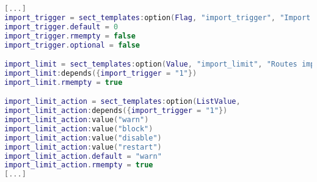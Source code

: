 \begin{lstlisting}[language=lua, caption={LUCI tied options implementation}]
[...]
import_trigger = sect_templates:option(Flag, "import_trigger", "Import       Limit", "Enable Routes Import limit settings")
import_trigger.default = 0
import_trigger.rmempty = false
import_trigger.optional = false

import_limit = sect_templates:option(Value, "import_limit", "Routes import   limit", "Specify an import route limit.")
import_limit:depends({import_trigger = "1"})
import_limit.rmempty = true

import_limit_action = sect_templates:option(ListValue,                       "import_limit_action", "Routes import limit action", "Action to take when    import routes limit ir reached")
import_limit_action:depends({import_trigger = "1"})
import_limit_action:value("warn")
import_limit_action:value("block")
import_limit_action:value("disable")
import_limit_action:value("restart")
import_limit_action.default = "warn"
import_limit_action.rmempty = true
[...]
\end{lstlisting}